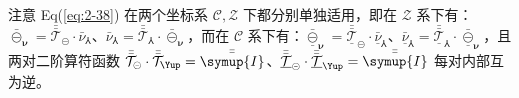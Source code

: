 注意 Eq(\ref{eq:2-38}) 在两个坐标系 $\mathcal{C,Z}$ 下都分别单独适用，即在 $\mathcal{Z}$ 系下有：$\bar{\circleddash}_{\symbf{\nu}} = \bar{\bar{\mathcal{T}}}_{\circleddash} \cdot {\bar{\nu}}_{\Yup}$、${\bar{\nu}}_{\Yup} = \bar{\bar{\mathcal{T}}}_{\Yup} \cdot \bar{\circleddash}_{\symbf{\nu}}$，而在 $\mathcal{C}$ 系下有：$\bar{\underline{\circleddash}}_{\symbf{\nu}} = \bar{\bar{\underline{\mathcal{T}}}}_{\circleddash} \cdot {\bar{\underline{\nu}}}_{\Yup}$、${\bar{\underline{\nu}}}_{\Yup} = \bar{\bar{\underline{\mathcal{T}}}}_{\Yup} \cdot \bar{\underline{\circleddash}}_{\symbf{\nu}}$，且两对二阶算符函数 $\bar{\bar{\mathcal{T}}}_{\circleddash} \cdot \bar{\bar{\mathcal{T}}}_{\Yup} = \bar{\bar{\symup{I}}}$、$\bar{\bar{\underline{\mathcal{T}}}}_{\circleddash} \cdot \bar{\bar{\underline{\mathcal{T}}}}_{\Yup} = \bar{\bar{\symup{I}}}$ 每对内部互为逆。

